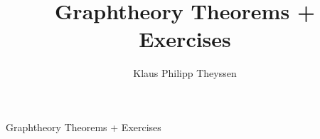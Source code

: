 \documentclass[a4paper]{article}
\title{Graphtheory Theorems + Exercises}
\author{Klaus Philipp Theyssen}
\begin{document}
\begin{center}
    \Large Graphtheory Theorems + Exercises
\end{center}




\end{document}
